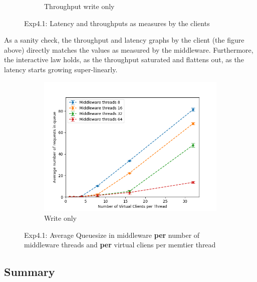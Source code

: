 \documentclass[11pt,a4paper]{article}
\begin{document}
\begin{figure}[H]
\begin{subfigure}{.5\textwidth}
    \caption{Throughput write only}
    \label{fig:mesh1}
\end{subfigure}
\caption{Exp4.1: Latency and throughputs as measures by the clients}
\label{fig:test}
\end{figure}

As a sanity check, the throughput and latency graphs by the client (the figure above) directly matches the values as measured by the middleware.
Furthermore, the interactive law holds, as the throughput saturated and flattens out, as the latency starts growing super-linearly.


\begin{figure}[H]
\centering
\begin{subfigure}{.5\textwidth}
      \centering
    \includegraphics[width=\textwidth]{img/exp4_1/exp4_1__queuesize_middleware_write_1.png}
    \caption{Write only}
    \label{fig:mesh1}
\end{subfigure}
\caption{Exp4.1: Average Queuesize in middleware \textbf{per} number of middleware threads and \textbf{per} virtual cliens per memtier thread}
\label{fig:test}
\end{figure}



\subsection{Summary}
\end{document}
